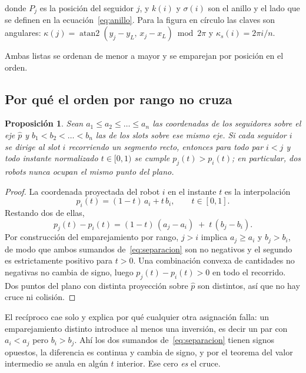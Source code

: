 \documentclass[11pt,a4paper]{article}
\theoremstyle{plain}
\newtheorem{proposicion}{Proposición}
\newcommand{\pp}{\hat{p}}
\begin{document}
\noindent
donde $P_j$ es la posición del seguidor $j$, y $k(i)$ y $\sigma(i)$ son el
anillo y el lado que se definen en la ecuación~\eqref{eq:anillo}. Para la
figura en círculo las claves son angulares:
$\kappa(j) = \operatorname{atan2}(y_j - y_L,\, x_j - x_L) \bmod 2\pi$ y
$\kappa_s(i) = 2\pi i / n$.

Ambas listas se ordenan de menor a mayor y se emparejan por posición en el
orden.

\subsection{Por qué el orden por rango no cruza}

\begin{proposicion}\label{prop:cruces}
Sean $a_1 \le a_2 \le \dots \le a_n$ las coordenadas de los seguidores sobre el
eje $\pp$ y $b_1 < b_2 < \dots < b_n$ las de los slots sobre ese mismo eje. Si
cada seguidor $i$ se dirige al slot $i$ recorriendo un segmento recto, entonces
para todo par $i < j$ y todo instante normalizado $t \in [0,1)$ se cumple
$p_j(t) > p_i(t)$; en particular, dos robots nunca ocupan el mismo punto del
plano.
\end{proposicion}

\begin{proof}
La coordenada proyectada del robot $i$ en el instante $t$ es la interpolación
\begin{equation}
  p_i(t) = (1-t)\,a_i + t\,b_i, \qquad t\in[0,1].
  \label{eq:trayectoria}
\end{equation}
Restando dos de ellas,
\begin{equation}
  p_j(t) - p_i(t) = (1-t)\,(a_j - a_i) \;+\; t\,(b_j - b_i).
  \label{eq:separacion}
\end{equation}
Por construcción del emparejamiento por rango, $j > i$ implica $a_j \ge a_i$ y
$b_j > b_i$, de modo que ambos sumandos de~\eqref{eq:separacion} son no
negativos y el segundo es estrictamente positivo para $t > 0$. Una combinación
convexa de cantidades no negativas no cambia de signo, luego
$p_j(t) - p_i(t) > 0$ en todo el recorrido. Dos puntos del plano con distinta
proyección sobre $\pp$ son distintos, así que no hay cruce ni colisión.
\end{proof}

El recíproco cae solo y explica por qué cualquier otra asignación falla:
un emparejamiento distinto introduce al menos una inversión, es decir un par
con $a_i < a_j$ pero $b_i > b_j$. Ahí los dos sumandos
de~\eqref{eq:separacion} tienen signos opuestos, la diferencia es continua y
cambia de signo, y por el teorema del valor intermedio se anula en algún $t$
interior. Ese cero \emph{es} el cruce.
\end{document}
